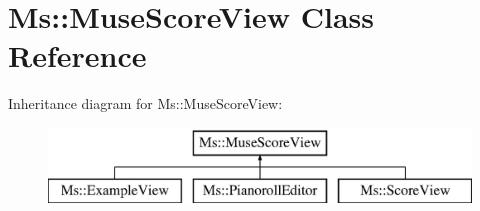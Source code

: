 \hypertarget{class_ms_1_1_muse_score_view}{}\section{Ms\+:\+:Muse\+Score\+View Class Reference}
\label{class_ms_1_1_muse_score_view}
Inheritance diagram for Ms\+:\+:Muse\+Score\+View\+:\begin{figure}[H]
\begin{center}
\leavevmode
\includegraphics[height=2.000000cm]{class_ms_1_1_muse_score_view}
\end{center}
\end{figure}
